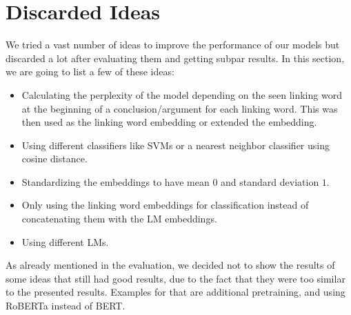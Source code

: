 \section{Discarded Ideas}
We tried a vast number of ideas to improve the performance of our models but discarded a lot after evaluating them and getting subpar results. In this section, we are going to list a few of these ideas:

\begin{itemize}
	\item Calculating the perplexity of the model depending on the seen linking word at the beginning of a conclusion/argument 			  for each linking word. This was then used as the linking word embedding or extended the embedding.
	\item Using different classifiers like SVMs or a nearest neighbor classifier using cosine distance.
	\item Standardizing the embeddings to have mean $0$ and standard deviation $1$.
	\item Only using the linking word embeddings for classification instead of concatenating them with the LM embeddings.
	\item Using different LMs.
\end{itemize} 

As already mentioned in the evaluation, we decided not to show the results of some ideas that still had good results, due to the fact that they were too similar to the presented results. Examples for that are additional pretraining, and using RoBERTa instead of BERT.